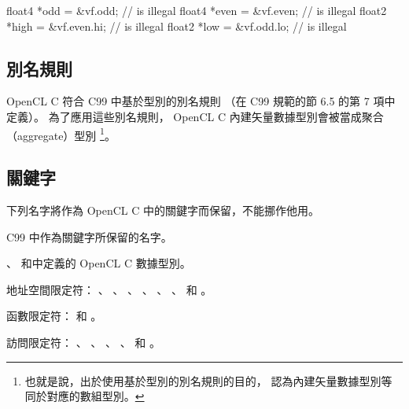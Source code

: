 float4	*odd = &vf.odd;		// is illegal
float4	*even = &vf.even;	// is illegal
float2	*high = &vf.even.hi;	// is illegal
float2	*low = &vf.odd.lo;	// is illegal
\stopclc

\subsection{別名規則}

OpenCL C  符合 C99 中基於型別的別名規則
（在 C99 規範的節 6.5 的第 7 項中定義）。
為了應用這些別名規則， OpenCL C 內建矢量數據型別會被當成聚合（aggregate）型別
\footnote{也就是說，出於使用基於型別的別名規則的目的，
認為內建矢量數據型別等同於對應的數組型別。}。

\subsection{關鍵字}

下列名字將作為 OpenCL C 中的關鍵字而保留，不能挪作他用。
\startigBase
\item C99 中作為關鍵字所保留的名字。

\item {}、
和中定義的 OpenCL C 數據型別。

\item 地址空間限定符：
 、 、 、 、
 、 、  和 。

\item 函數限定符：  和 。

\item 訪問限定符：
 、 、 、 、
  和 。
\stopigBase

